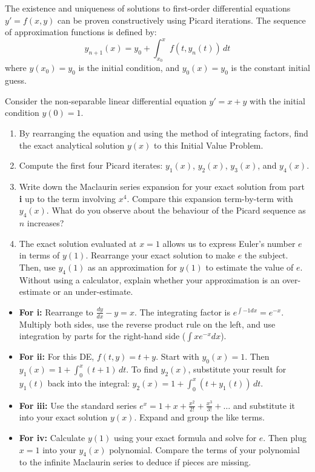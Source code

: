 \begin{problem}
The existence and uniqueness of solutions to first-order differential equations $y' = f(x,y)$ can be proven constructively using Picard iterations. The sequence of approximation functions is defined by:
\[ y_{n+1}(x) = y_0 + \int_{x_0}^x f(t, y_n(t)) \, dt \]
where $y(x_0) = y_0$ is the initial condition, and $y_0(x) = y_0$ is the constant initial guess.

Consider the non-separable linear differential equation $y' = x + y$ with the initial condition $y(0) = 1$.

\begin{enumerate}
    \item[\textbf{i}] By rearranging the equation and using the method of integrating factors, find the exact analytical solution $y(x)$ to this Initial Value Problem.
    \item[\textbf{ii}] Compute the first four Picard iterates: $y_1(x)$, $y_2(x)$, $y_3(x)$, and $y_4(x)$.
    \item[\textbf{iii}] Write down the Maclaurin series expansion for your exact solution from part \textbf{i} up to the term involving $x^4$. Compare this expansion term-by-term with $y_4(x)$. What do you observe about the behaviour of the Picard sequence as $n$ increases?
    \item[\textbf{iv}] The exact solution evaluated at $x=1$ allows us to express Euler's number $e$ in terms of $y(1)$. Rearrange your exact solution to make $e$ the subject. Then, use $y_4(1)$ as an approximation for $y(1)$ to estimate the value of $e$. Without using a calculator, explain whether your approximation is an over-estimate or an under-estimate.
\end{enumerate}
\end{problem}

\begin{hint}
\begin{itemize}
    \item \textbf{For i:} Rearrange to $\frac{dy}{dx} - y = x$. The integrating factor is $e^{\int -1 dx} = e^{-x}$. Multiply both sides, use the reverse product rule on the left, and use integration by parts for the right-hand side ($\int xe^{-x} dx$).
    \item \textbf{For ii:} For this DE, $f(t, y) = t + y$. Start with $y_0(x) = 1$. Then $y_1(x) = 1 + \int_0^x (t + 1) \, dt$. To find $y_2(x)$, substitute your result for $y_1(t)$ back into the integral: $y_2(x) = 1 + \int_0^x (t + y_1(t)) \, dt$.
    \item \textbf{For iii:} Use the standard series $e^x = 1 + x + \frac{x^2}{2!} + \frac{x^3}{3!} + \dots$ and substitute it into your exact solution $y(x)$. Expand and group the like terms.
    \item \textbf{For iv:} Calculate $y(1)$ using your exact formula and solve for $e$. Then plug $x=1$ into your $y_4(x)$ polynomial. Compare the terms of your polynomial to the infinite Maclaurin series to deduce if pieces are missing.
\end{itemize}
\end{hint}

